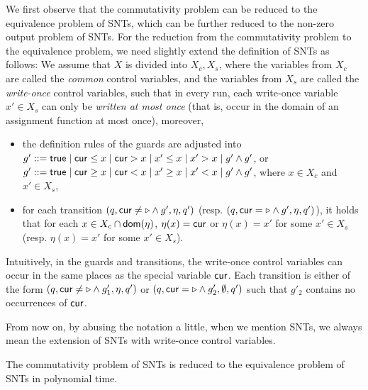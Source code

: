 We first observe that the commutativity problem can be reduced to the equivalence problem of SNTs, which can be further reduced to the non-zero output problem of SNTs. For the reduction from the commutativity problem to the equivalence problem, we need slightly extend the definition of SNTs as follows: We assume that $X$ is divided into $X_c, X_s$, where the variables from $X_c$ are called the \emph{common} control variables, and the variables from $X_s$ are called the \emph{write-once} control variables, such that in every run, each write-once variable $x' \in X_s$ can only be \emph{written at most once} (that is, occur in the domain of an assignment function at most once), moreover, 
\begin{itemize}
\item the definition rules of the guards are adjusted into $g'::= \mathsf{true} \mid \mathsf{cur} \le x \mid \mathsf{cur} > x \mid x' \le x \mid x' > x \mid g' \wedge g'$, or $g'::= \mathsf{true} \mid \mathsf{cur} \ge x \mid \mathsf{cur} < x \mid x' \ge x \mid x' < x \mid g' \wedge g'$, where $x \in X_c$ and $x' \in X_s$,
\item for each transition $(q,\mathsf{cur} \neq \triangleright \wedge g', \eta, q')$ (resp. $(q,\mathsf{cur} = \triangleright \wedge g', \eta, q')$), it holds that for each $x \in X_c \cap \mathsf{dom}(\eta)$, $\eta(x)  = \mathsf{cur}$ or $\eta(x)=x'$ for some $x' \in X_s$ (resp. $\eta(x)=x'$ for some $x' \in X_s$).
\end{itemize}
Intuitively, in the guards and transitions, the write-once control variables can occur in the same places as the special variable $\mathsf{cur}$. Each transition is either of the form $(q, \mathsf{cur} \neq \triangleright \wedge g'_1, \eta, q')$ or $(q, \mathsf{cur} = \triangleright \wedge g'_2, \emptyset, q')$ such that $g'_2$ contains no occurrences of $\mathsf{cur}$. 

From now on, by abusing the notation a little, when we mention SNTs, we always mean the extension of SNTs with write-once control variables.


\vspace{-1mm}
\begin{proposition}\label{prop-snt-cmm-to-eqv}
The commutativity problem of SNTs is reduced to the equivalence problem of SNTs in polynomial time.
\end{proposition}

